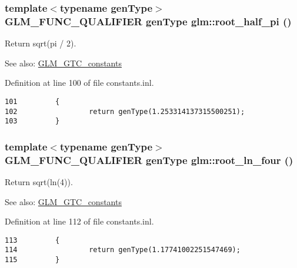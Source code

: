 \hypertarget{group__gtc__constants_g39bda21134486f771067238aa263c562}{
\subsubsection[root\_\-half\_\-pi]{\setlength{\rightskip}{0pt plus 5cm}template$<$typename genType$>$ GLM\_\-FUNC\_\-QUALIFIER genType glm::root\_\-half\_\-pi ()}}
\label{group__gtc__constants_g39bda21134486f771067238aa263c562}


Return sqrt(pi / 2). \begin{Desc}
\item[See also:]\hyperlink{group__gtc__constants}{GLM\_\-GTC\_\-constants} \end{Desc}


Definition at line 100 of file constants.inl.

\begin{Code}\begin{verbatim}101         {
102                 return genType(1.253314137315500251);
103         }
\end{verbatim}
\end{Code}


\hypertarget{group__gtc__constants_g0f121de1b70ce7379c08f47291efdb49}{
\subsubsection[root\_\-ln\_\-four]{\setlength{\rightskip}{0pt plus 5cm}template$<$typename genType$>$ GLM\_\-FUNC\_\-QUALIFIER genType glm::root\_\-ln\_\-four ()}}
\label{group__gtc__constants_g0f121de1b70ce7379c08f47291efdb49}


Return sqrt(ln(4)). \begin{Desc}
\item[See also:]\hyperlink{group__gtc__constants}{GLM\_\-GTC\_\-constants} \end{Desc}


Definition at line 112 of file constants.inl.

\begin{Code}\begin{verbatim}113         {
114                 return genType(1.17741002251547469);
115         }
\end{verbatim}
\end{Code}


